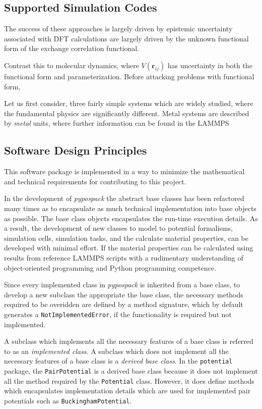 \subsection{Supported Simulation Codes}

The success of these approaches is largely driven by epistemic uncertainty associated with DFT calculations are largely driven by the unknown functional form of the exchange correlation functional.

Contrast this to molecular dynamics, where $V(\bm{r}_{ij})$ has uncertainty in both the functional form and parameterization.  Before attacking problems with functional form,

Let us first consider, three fairly simple systems which are widely studied, where the fundamental physics are significantly different.  Metal systems are described by
\emph{metal} units, where further information can be found in the LAMMPS

\subsection{Software Design Principles}

This software package is implemented in a way to minimize the mathematical and technical requirements for contributing to this project.

In the development of \emph{pypospack} the abstract base classes has been refactored many times as to encapsulate as much technical implementation into base objects as possible.  The base class objects encapsulates the run-time execution details.  As a result, the development of new classes to model to potential formalisms, simulation cells, simulation tasks, and the calculate material properties, can be developed with minimal effort.  If the material properties can be calculated using results from reference LAMMPS scripts with a rudimentary understanding of object-oriented programming and Python programming competence.

Since every implemented class in \emph{pypospack} is inherited from a base class, to develop a new subclass the appropriate the base class, the necessary methods required to be overidden are defined by a method signature, which by default generates a \verb|NotImplementedError|, if the functionality is required but not implemented.

A subclass which implements all the necessary features of a base class is referred to as an \emph{implemented class}.  A subclass which does not implement all the necessary features of a base class is a \emph{derived base class}.  In the \verb|potential| package, the \verb|PairPotential| is a derived base class because  it does not implement all the method required by the \verb|Potential| class.  However, it does define methods which encapsulates implementation details which are used for implemented pair potentials such as \verb|BuckinghamPotential|.

